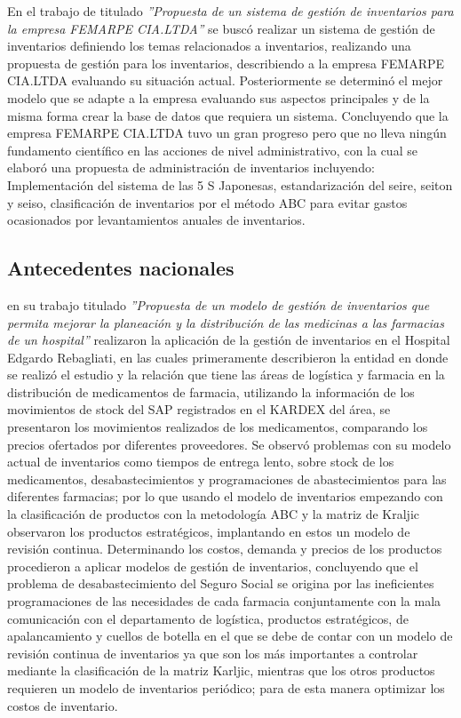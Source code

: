 En el trabajo de \cite{loja2015propuesta} titulado \textsl{''Propuesta de un sistema de gestión de inventarios para la empresa FEMARPE CIA.LTDA''} se buscó realizar un sistema de gestión de inventarios definiendo los temas relacionados a inventarios, realizando una propuesta de gestión para los inventarios, describiendo a la empresa FEMARPE CIA.LTDA evaluando su situación actual. Posteriormente se determinó el mejor modelo que se adapte a la empresa evaluando sus aspectos principales y de la misma forma crear la base de datos que requiera un sistema. Concluyendo que la empresa FEMARPE CIA.LTDA tuvo un gran progreso pero que no lleva ningún fundamento científico en las acciones de nivel administrativo, con la cual se elaboró una propuesta de administración de inventarios incluyendo: Implementación del sistema de las 5 S Japonesas, estandarización del seire, seiton y seiso, clasificación de inventarios por el método ABC para evitar gastos ocasionados por levantamientos anuales de inventarios.

\newpage
\subsection{Antecedentes nacionales}
\cite{caceres2010propuesta} en su trabajo titulado \textsl{''Propuesta de un modelo de gestión de inventarios que permita mejorar la planeación y la distribución de las medicinas a las farmacias de un hospital''} realizaron la aplicación de la gestión de inventarios en el Hospital Edgardo Rebagliati, en las cuales primeramente describieron la entidad en donde se realizó el estudio y la relación que tiene las áreas de logística y farmacia en la distribución de medicamentos de farmacia, utilizando la información de los movimientos de stock del SAP registrados en el KARDEX del área, se presentaron los movimientos realizados de los medicamentos, comparando los precios ofertados por diferentes proveedores. Se observó problemas con su modelo actual de inventarios como tiempos de entrega lento, sobre stock de los medicamentos, desabastecimientos y programaciones de abastecimientos para las diferentes farmacias; por lo que usando el modelo de inventarios empezando con la clasificación de productos con la metodología ABC y la matriz de Kraljic observaron los productos estratégicos, implantando en estos un modelo de revisión continua. Determinando los costos, demanda y precios de los productos procedieron a aplicar modelos de gestión de inventarios, concluyendo que el problema de desabastecimiento del Seguro Social se origina por las ineficientes programaciones de las necesidades de cada farmacia conjuntamente con la mala comunicación con el departamento de logística, productos estratégicos, de apalancamiento y cuellos de botella en el que se debe de contar con un modelo de revisión continua de inventarios ya que son los más importantes a controlar mediante la clasificación de la matriz Karljic, mientras que los otros productos requieren un modelo de inventarios periódico; para de esta manera optimizar los costos de inventario.

